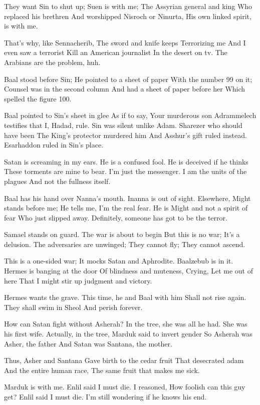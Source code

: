 \documentclass[
]{book}
\begin{document}
They want Sin to shut up;
Suen is with me;
The Assyrian general and king
Who replaced his brethren
And worshipped Nisroch or Ninurta,
His own linked spirit, is with me.

That's why, like Sennacherib,
The sword and knife keeps
Terrorizing me
And I even saw a terrorist
Kill an American journalist
In the desert on tv.
The Arabians are the problem, huh.

Baal stood before Sin;
He pointed to a sheet of paper
With the number 99 on it;
Counsel was in the second column
And had a sheet of paper before her
Which spelled the figure 100.

Baal pointed to Sin's sheet in glee
As if to say, Your murderous son
Adrammelech testifies that I, Hadad, rule.
Sin was silent unlike Adam.
Sharezer who should have been
The King's protector murdered him
And Asshur's gift ruled instead.
Esarhaddon ruled in Sin's place.

Satan is screaming in my ears.
He is a confused fool.
He is deceived if he thinks
These torments are mine to bear.
I'm just the messenger.
I am the units of the plagues
And not the fullness itself.

Baal has his hand over Nanna's mouth.
Inanna is out of sight.
Elsewhere, Might stands before me;
He tells me, I'm the real fear.
He is Might and not a spirit of fear
Who just slipped away.
Definitely, someone has got to be the terror.

Samael stands on guard.
The war is about to begin
But this is no war;
It's a delusion.
The adversaries are unwinged;
They cannot fly;
They cannot ascend.

This is a one-sided war;
It mocks Satan and Aphrodite.
Baalzebub is in it.
Hermes is banging at the door
Of blindness and muteness,
Crying, Let me out of here
That I might stir up judgment and victory.

Hermes wants the grave.
This time, he and Baal with him
Shall not rise again.
They shall swim in Sheol
And perish forever.

How can Satan fight without Asherah?
In the tree, she was all he had.
She was his first wife.
Actually, in the tree,
Marduk said to invert gender
So Asherah was Asher, the father
And Satan was Santana, the mother.

Thus, Asher and Santana
Gave birth to the cedar fruit
That desecrated adam
And the entire human race,
The same fruit that makes me sick.

Marduk is with me.
Enlil said I must die.
I reasoned, How foolish can this guy get?
Enlil said I must die.
I'm still wondering if he knows his end.
\end{document}
